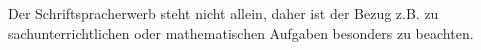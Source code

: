 Der Schriftspracherwerb steht nicht allein, daher ist der Bezug z.B. zu sachunterrichtlichen oder mathematischen Aufgaben besonders zu beachten.